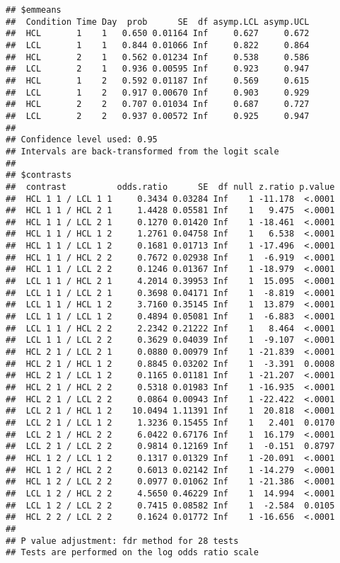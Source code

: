 \documentclass[
]{article}
\begin{document}
\begin{verbatim}
## $emmeans
##  Condition Time Day  prob      SE  df asymp.LCL asymp.UCL
##  HCL       1    1   0.650 0.01164 Inf     0.627     0.672
##  LCL       1    1   0.844 0.01066 Inf     0.822     0.864
##  HCL       2    1   0.562 0.01234 Inf     0.538     0.586
##  LCL       2    1   0.936 0.00595 Inf     0.923     0.947
##  HCL       1    2   0.592 0.01187 Inf     0.569     0.615
##  LCL       1    2   0.917 0.00670 Inf     0.903     0.929
##  HCL       2    2   0.707 0.01034 Inf     0.687     0.727
##  LCL       2    2   0.937 0.00572 Inf     0.925     0.947
## 
## Confidence level used: 0.95 
## Intervals are back-transformed from the logit scale 
## 
## $contrasts
##  contrast          odds.ratio      SE  df null z.ratio p.value
##  HCL 1 1 / LCL 1 1     0.3434 0.03284 Inf    1 -11.178  <.0001
##  HCL 1 1 / HCL 2 1     1.4428 0.05581 Inf    1   9.475  <.0001
##  HCL 1 1 / LCL 2 1     0.1270 0.01420 Inf    1 -18.461  <.0001
##  HCL 1 1 / HCL 1 2     1.2761 0.04758 Inf    1   6.538  <.0001
##  HCL 1 1 / LCL 1 2     0.1681 0.01713 Inf    1 -17.496  <.0001
##  HCL 1 1 / HCL 2 2     0.7672 0.02938 Inf    1  -6.919  <.0001
##  HCL 1 1 / LCL 2 2     0.1246 0.01367 Inf    1 -18.979  <.0001
##  LCL 1 1 / HCL 2 1     4.2014 0.39953 Inf    1  15.095  <.0001
##  LCL 1 1 / LCL 2 1     0.3698 0.04171 Inf    1  -8.819  <.0001
##  LCL 1 1 / HCL 1 2     3.7160 0.35145 Inf    1  13.879  <.0001
##  LCL 1 1 / LCL 1 2     0.4894 0.05081 Inf    1  -6.883  <.0001
##  LCL 1 1 / HCL 2 2     2.2342 0.21222 Inf    1   8.464  <.0001
##  LCL 1 1 / LCL 2 2     0.3629 0.04039 Inf    1  -9.107  <.0001
##  HCL 2 1 / LCL 2 1     0.0880 0.00979 Inf    1 -21.839  <.0001
##  HCL 2 1 / HCL 1 2     0.8845 0.03202 Inf    1  -3.391  0.0008
##  HCL 2 1 / LCL 1 2     0.1165 0.01181 Inf    1 -21.207  <.0001
##  HCL 2 1 / HCL 2 2     0.5318 0.01983 Inf    1 -16.935  <.0001
##  HCL 2 1 / LCL 2 2     0.0864 0.00943 Inf    1 -22.422  <.0001
##  LCL 2 1 / HCL 1 2    10.0494 1.11391 Inf    1  20.818  <.0001
##  LCL 2 1 / LCL 1 2     1.3236 0.15455 Inf    1   2.401  0.0170
##  LCL 2 1 / HCL 2 2     6.0422 0.67176 Inf    1  16.179  <.0001
##  LCL 2 1 / LCL 2 2     0.9814 0.12169 Inf    1  -0.151  0.8797
##  HCL 1 2 / LCL 1 2     0.1317 0.01329 Inf    1 -20.091  <.0001
##  HCL 1 2 / HCL 2 2     0.6013 0.02142 Inf    1 -14.279  <.0001
##  HCL 1 2 / LCL 2 2     0.0977 0.01062 Inf    1 -21.386  <.0001
##  LCL 1 2 / HCL 2 2     4.5650 0.46229 Inf    1  14.994  <.0001
##  LCL 1 2 / LCL 2 2     0.7415 0.08582 Inf    1  -2.584  0.0105
##  HCL 2 2 / LCL 2 2     0.1624 0.01772 Inf    1 -16.656  <.0001
## 
## P value adjustment: fdr method for 28 tests 
## Tests are performed on the log odds ratio scale
\end{verbatim}
\end{document}
